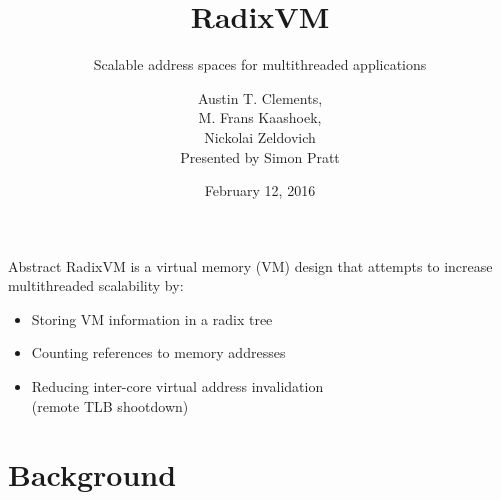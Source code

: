 \documentclass[aspectratio=169]{beamer}
\title{RadixVM}
\subtitle{Scalable address spaces for multithreaded applications}
\author[Presented by Simon Pratt]{Austin T. Clements,\\M. Frans Kaashoek,\\Nickolai Zeldovich\\
  \vspace{2em}Presented by Simon Pratt}
\date{February 12, 2016}
\newcommand{\bi}{\begin{itemize}}
\newcommand{\ei}{\end{itemize}}
\begin{document}
\frame[plain]{\titlepage}

\newpage

\begin{frame}{Abstract}
  RadixVM is a virtual memory (VM) design that attempts to increase multithreaded scalability by:
  \bi
\item Storing VM information in a radix tree
  \pause
\item Counting references to memory addresses
  \pause
\item Reducing inter-core virtual address invalidation\\(remote TLB shootdown)
  \ei
\end{frame}

\section{Background}
\end{document}
